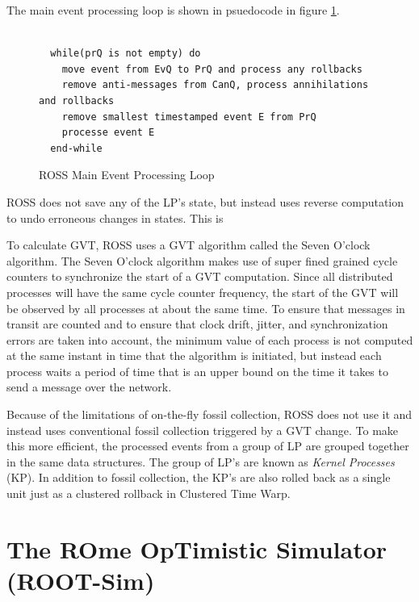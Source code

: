 \documentclass[11pt]{book}
\begin{document}
\noindent
The main event processing loop is shown in psuedocode in figure \ref{ross_loop}.

\begin{figure}
\centering
\begin{verbatim}

  while(prQ is not empty) do
    move event from EvQ to PrQ and process any rollbacks
    remove anti-messages from CanQ, process annihilations and rollbacks
    remove smallest timestamped event E from PrQ
    processe event E
  end-while

\end{verbatim}
\caption{ROSS Main Event Processing Loop\label{ross_loop}}
\end{figure}

ROSS does not save any of the LP's state, but instead uses reverse computation to undo erroneous
changes in states. This is 

To calculate GVT, ROSS uses a GVT algorithm called the Seven O'clock algorithm. The Seven O'clock
algorithm makes use of super fined grained cycle counters to synchronize the start of a GVT computation.
Since all distributed processes will have the same cycle counter frequency, the start of the GVT will
be observed by all processes at about the same time. To ensure that messages in transit are counted
and to ensure that clock drift, jitter, and synchronization errors are taken into account, the minimum
value of each process is not computed at the same instant in time that the algorithm is initiated, but
instead each process waits a period of time that is an upper bound on the time it takes to send a
message over the network\cite{bauer-05}.

Because of the limitations of on-the-fly fossil collection, ROSS does not use it and instead uses
conventional fossil collection triggered by a GVT change. To make this more efficient, the processed
events from a group of LP are grouped together in the same data structures. The group of LP's are
known as \emph{Kernel Processes} (KP). In addition to fossil collection, the KP's are also rolled
back as a single unit just as a clustered rollback in Clustered Time Warp.


\section{The ROme OpTimistic Simulator (ROOT-Sim)}
\end{document}
